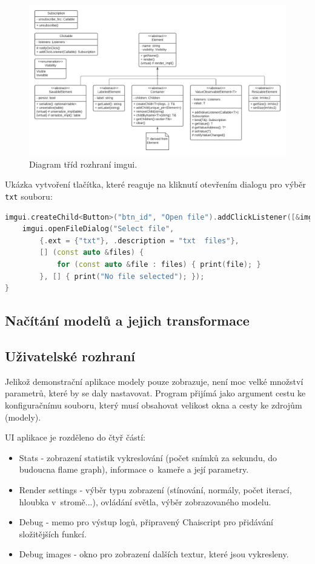 \begin{figure}[H]
	\centering
	\includegraphics[scale=0.5]{obrazky-figures/pfimgui_classes.pdf}
	\caption{Diagram tříd rozhraní imgui.}
	\label{fig:imgui_classes}
\end{figure}


Ukázka vytvoření tlačítka, které reaguje na kliknutí otevřením dialogu pro výběr \texttt{txt} souboru:

\begin{lstlisting}[language=C++, caption={Tvorba logického zařízení}]
imgui.createChild<Button>("btn_id", "Open file").addClickListener([&imgui] {
    imgui.openFileDialog("Select file", 
        {.ext = {"txt"}, .description = "txt  files"}, 
        [] (const auto &files) {
            for (const auto &file : files) { print(file); }
        }, [] { print("No file selected"); });
}
\end{lstlisting}

\subsection{Načítání modelů a jejich transformace}


\subsection{Uživatelské rozhraní}
Jelikož demonstrační aplikace modely pouze zobrazuje, není moc velké množství parametrů, které by se daly nastavovat. Program přijímá jako argument cestu ke konfiguračnímu souboru, který musí obsahovat velikost okna a cesty ke zdrojům (modely).

UI aplikace je rozděleno do čtyř částí:

\begin{itemize}
	\item Stats - zobrazení statistik vykreslování (počet snímků za sekundu, do budoucna flame graph), informace o~kameře a její parametry.
	\item Render settings - výběr typu zobrazení (stínování, normály, počet iterací, hloubka v~stromě...), ovládání světla, výběr zobrazovaného modelu.
	\item Debug - memo pro výstup logů, připravený Chaiscript pro přidávání složitějších funkcí.
	\item Debug images - okno pro zobrazení dalších textur, které jsou vykresleny.
\end{itemize}

